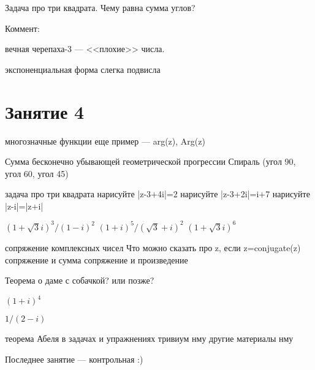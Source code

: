 \documentclass[12pt,a4paper]{article}
\begin{document}
Задача про три квадрата. Чему равна сумма углов?




Коммент: 

вечная черепаха-3 --- <<плохие>> числа.

экспоненциальная форма слегка подвисла


\section{Занятие 4}


многозначные функции
еще пример --- arg(z), Arg(z)







Сумма бесконечно убывающей геометрической прогрессии
Спираль (угол 90, угол 60, угол 45)

задача про три квадрата
нарисуйте |z-3+4i|=2
нарисуйте |z-3+2i|=i+7
нарисуйте |z-i|=|z+i|

$(1+\sqrt{3}i)^3/(1-i)^2$
$(1+i)^5/(\sqrt{3}+i)^2$
$(1+\sqrt{3}i)^6$

сопряжение комплексных чисел
Что можно сказать про z, если z=conjugate(z)
сопряжение и сумма
сопряжение и произведение


Теорема о даме с собачкой? или позже?



$(1+i)^4$


$1/(2-i)$

теорема Абеля в задачах и упражнениях
тривиум нму
другие материалы нму



Последнее занятие --- контрольная :)
\end{document}
